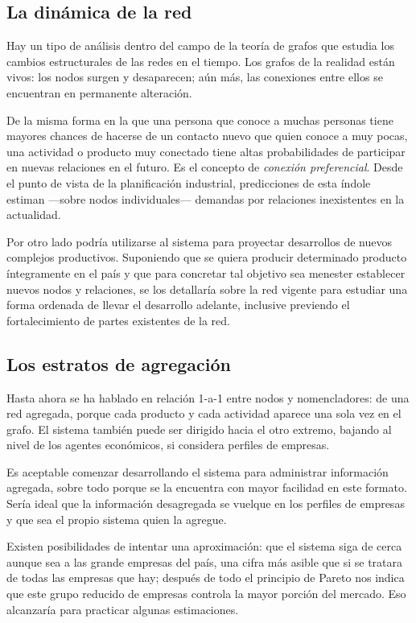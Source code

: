 \documentclass[a4paper]{report}
\begin{document}
\subsection*{La dinámica de la red}

Hay un tipo de análisis dentro del campo de la teoría de grafos que estudia los cambios estructurales de las redes en el tiempo. Los grafos de la realidad están vivos: los nodos surgen y desaparecen; aún más, las conexiones entre ellos se encuentran en permanente alteración.

De la misma forma en la que una persona que conoce a muchas personas tiene mayores chances de hacerse de un contacto nuevo que quien conoce a muy pocas, una actividad o producto muy conectado tiene altas probabilidades de participar en nuevas relaciones en el futuro. Es el concepto de \textit{conexión preferencial}. Desde el punto de vista de la planificación industrial, predicciones de esta índole estiman —sobre nodos individuales— demandas por relaciones inexistentes en la actualidad.

Por otro lado podría utilizarse al sistema para proyectar desarrollos de nuevos complejos productivos. Suponiendo que se quiera producir determinado producto íntegramente en el país y que para concretar tal objetivo sea menester establecer nuevos nodos y relaciones, se los detallaría sobre la red vigente para estudiar una forma ordenada de llevar el desarrollo adelante, inclusive previendo el fortalecimiento de partes existentes de la red.

\subsection*{Los estratos de agregación}

Hasta ahora se ha hablado en relación 1-a-1 entre nodos y nomencladores: de una red agregada, porque cada producto y cada actividad aparece una sola vez en el grafo. El sistema también puede ser dirigido hacia el otro extremo, bajando al nivel de los agentes económicos, si considera perfiles de empresas.

Es aceptable comenzar desarrollando el sistema para administrar información agregada, sobre todo porque se la encuentra con mayor facilidad en este formato. Sería ideal que la información desagregada se vuelque en los perfiles de empresas y que sea el propio sistema quien la agregue.

Existen posibilidades de intentar una aproximación: que el sistema siga de cerca aunque sea a las grande empresas del país, una cifra más asible que si se tratara de todas las empresas que hay; después de todo el principio de Pareto nos indica que este grupo reducido de empresas controla la mayor porción del mercado. Eso alcanzaría para practicar algunas estimaciones.
\end{document}
